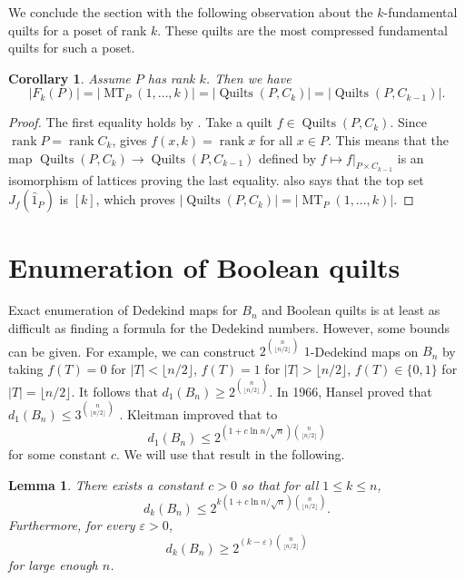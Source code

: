 \documentclass[12pt]{amsart}
\numberwithin{equation}{section}
\newtheorem{cor}[theorem]{Corollary}
\newtheorem{lemma}[theorem]{Lemma}
\theoremstyle{definition}
\newcommand{\floor}[1]{\lfloor {#1} \rfloor}
\newcommand{\MT}{\operatorname{MT}}
\newcommand{\quilt}{\operatorname{Quilts}}
\newcommand{\rank}{\operatorname{rank}}
\begin{document}
We conclude the section with the following observation about the
$k$-fundamental quilts for a poset of rank $k$.  These quilts are the
most compressed fundamental quilts for such a poset.  


\begin{cor}\label{cor:k.k-1}
Assume $P$ has rank $k$.  Then we have
\begin{equation}\label{eq:k.cor}
|F_k(P)| = |\MT_P(1,\ldots,k)| = |\quilt (P, C_{k})| = |\quilt (P, C_{k-1})|.
\end{equation}
\end{cor}
\begin{proof}
The first equality holds by .  Take a
quilt $f \in \quilt(P,C_k)$. Since $\rank P = \rank C_k$,
 gives $f(x,k) = \rank x$ for all $x \in
P$. This means that the map $\quilt (P, C_k) \longrightarrow \quilt
(P, C_{k-1})$ defined by $f \mapsto f|_{P \times C_{k-1}}$ is an
isomorphism of lattices proving the last equality.
 also says that the top set $J_f(\hat 1_P)$ is
$[k]$, which proves $|\quilt (P, C_{k})| = |\MT_P(1,\ldots,k)|$.
\end{proof}

\section{Enumeration of Boolean quilts} \label{sec:boolean}

Exact enumeration of Dedekind maps for $B_{n}$ and Boolean quilts is at least as difficult as
finding a formula for the Dedekind numbers. However, some bounds can
be given. For example, we can construct $2^{\binom n{\floor{n/2}}}$
$1$-Dedekind maps on $B_{n}$ by taking $f(T) = 0$ for $|T| <
\floor{n/2}$, $f(T) = 1$ for $|T| > \floor{n/2}$, $f(T) \in \{0,1\}$
for $|T| = \floor{n/2}$. It follows that $d_1(B_n) \geq 2^{\binom
n{\floor{n/2}}}$.  In 1966, Hansel proved that $d_1(B_n) \leq
3^{\binom n{\floor{n/2}}}$ \cite{hansel}. Kleitman \cite{kleitman} improved that to
\begin{equation}\label{eq:kleitman}
d_1(B_n) \leq 2^{(1+c \ln n/\sqrt n)\binom{n}{\floor{n/2}} }
\end{equation}
for some constant $c$. We will use that result in the following.


\begin{lemma} \label{lem:booleandedekind}
 There exists a constant $c > 0$ so that for all $1\leq k\leq n$,
 $$d_k(B_n) \leq 2^{k(1+c \ln n/\sqrt n)\binom{n}{\floor{n/2}} }.$$
 Furthermore, for every $\varepsilon > 0$,
 $$d_k(B_n) \geq 2^{(k-\varepsilon) \binom n {\floor{n/2}}}$$
 for large enough $n$.
\end{lemma}
\end{document}
